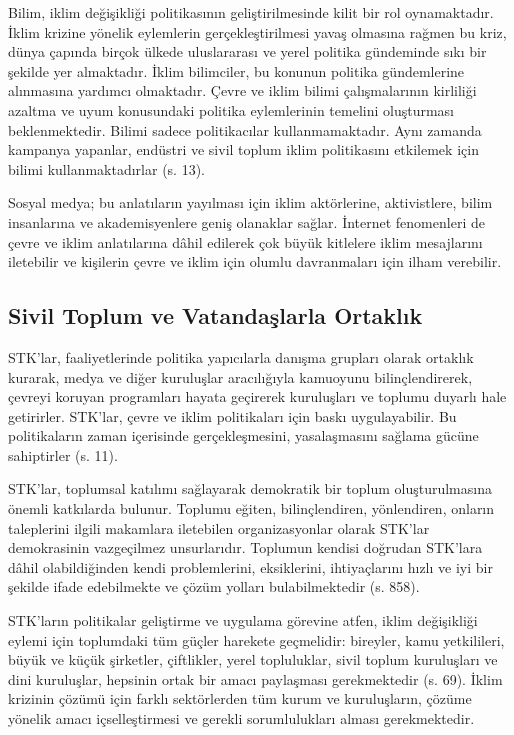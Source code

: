 \documentclass[
]{book}
\begin{document}
Bilim, iklim değişikliği politikasının geliştirilmesinde kilit bir rol oynamaktadır. İklim krizine yönelik eylemlerin gerçekleştirilmesi yavaş olmasına rağmen bu kriz, dünya çapında birçok ülkede uluslararası ve yerel politika gündeminde sıkı bir şekilde yer almaktadır. İklim bilimciler, bu konunun politika gündemlerine alınmasına yardımcı olmaktadır. Çevre ve iklim bilimi çalışmalarının kirliliği azaltma ve uyum konusundaki politika eylemlerinin temelini oluşturması beklenmektedir. Bilimi sadece politikacılar kullanmamaktadır. Aynı zamanda kampanya yapanlar, endüstri ve sivil toplum iklim politikasını etkilemek için bilimi kullanmaktadırlar (s. 13). \citep{morgan2018science}

Sosyal medya; bu anlatıların yayılması için iklim aktörlerine, aktivistlere, bilim insanlarına ve akademisyenlere geniş olanaklar sağlar. İnternet fenomenleri de çevre ve iklim anlatılarına dâhil edilerek çok büyük kitlelere iklim mesajlarını iletebilir ve kişilerin çevre ve iklim için olumlu davranmaları için ilham verebilir.

\hypertarget{sivil-toplum-ve-vatandaux15flarla-ortaklux131k}{%
\subsection{Sivil Toplum ve Vatandaşlarla Ortaklık}\label{sivil-toplum-ve-vatandaux15flarla-ortaklux131k}}

STK'lar, faaliyetlerinde politika yapıcılarla danışma grupları olarak ortaklık kurarak, medya ve diğer kuruluşlar aracılığıyla kamuoyunu bilinçlendirerek, çevreyi koruyan programları hayata geçirerek kuruluşları ve toplumu duyarlı hale getirirler. STK'lar, çevre ve iklim politikaları için baskı uygulayabilir. Bu politikaların zaman içerisinde gerçekleşmesini, yasalaşmasını sağlama gücüne sahiptirler (s. 11). \citep{sisaye2021influence}

STK'lar, toplumsal katılımı sağlayarak demokratik bir toplum oluşturulmasına önemli katkılarda bulunur. Toplumu eğiten, bilinçlendiren, yönlendiren, onların taleplerini ilgili makamlara iletebilen organizasyonlar olarak STK'lar demokrasinin vazgeçilmez unsurlarıdır. Toplumun kendisi doğrudan STK'lara dâhil olabildiğinden kendi problemlerini, eksiklerini, ihtiyaçlarını hızlı ve iyi bir şekilde ifade edebilmekte ve çözüm yolları bulabilmektedir (s. 858). \citep{karatas2014toplumda}

STK'ların politikalar geliştirme ve uygulama görevine atfen, iklim değişikliği eylemi için toplumdaki tüm güçler harekete geçmelidir: bireyler, kamu yetkilileri, büyük ve küçük şirketler, çiftlikler, yerel topluluklar, sivil toplum kuruluşları ve dini kuruluşlar, hepsinin ortak bir amacı paylaşması gerekmektedir (s. 69). \citep{ponthieu2019climate} İklim krizinin çözümü için farklı sektörlerden tüm kurum ve kuruluşların, çözüme yönelik amacı içselleştirmesi ve gerekli sorumlulukları alması gerekmektedir.
\end{document}
